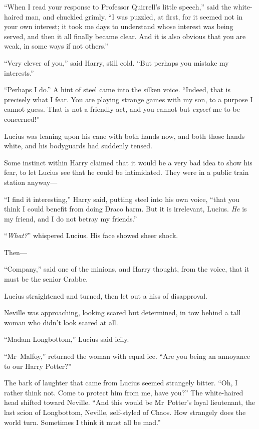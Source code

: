 “When I read your response to Professor Quirrell’s little speech,” said the white-haired man, and chuckled grimly. “I was puzzled, at first, for it seemed not in your own interest; it took me days to understand whose interest was being served, and then it all finally became clear. And it is also obvious that you are weak, in some ways if not others.”

“Very clever of you,” said Harry, still cold. “But perhaps you mistake my interests.”

“Perhaps I do.” A hint of steel came into the silken voice. “Indeed, that is precisely what I fear. You are playing strange games with my son, to a purpose I cannot guess. That is not a friendly act, and you cannot but \emph{expect} me to be concerned!”

Lucius was leaning upon his cane with both hands now, and both those hands white, and his bodyguards had suddenly tensed.

Some instinct within Harry claimed that it would be a very bad idea to show his fear, to let Lucius see that he could be intimidated. They were in a public train station anyway—

“I find it interesting,” Harry said, putting steel into his own voice, “that you think I could benefit from doing Draco harm. But it is irrelevant, Lucius. \emph{He} is my friend, and I do not betray my friends.”

“\emph{What?}” whispered Lucius. His face showed sheer shock.

Then—

“Company,” said one of the minions, and Harry thought, from the voice, that it must be the senior Crabbe.

Lucius straightened and turned, then let out a hiss of disapproval.

Neville was approaching, looking scared but determined, in tow behind a tall woman who didn’t look scared at all.

“Madam Longbottom,” Lucius said icily.

“Mr~Malfoy,” returned the woman with equal ice. “Are you being an annoyance to our Harry Potter?”

The bark of laughter that came from Lucius seemed strangely bitter. “Oh, I rather think not. Come to protect him from me, have you?” The white-haired head shifted toward Neville. “And this would be Mr~Potter’s loyal lieutenant, the last scion of Longbottom, Neville, self-styled of Chaos. How strangely does the world turn. Sometimes I think it must all be mad.”

